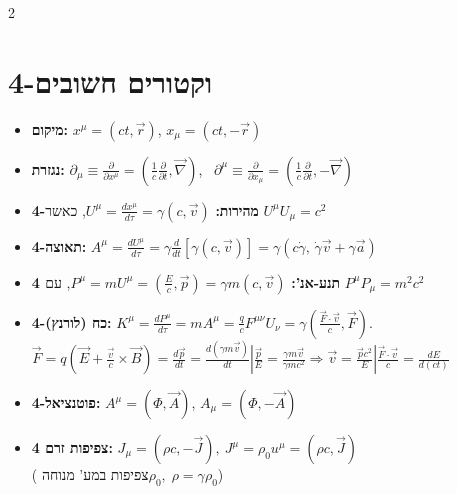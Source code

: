 \documentclass[10pt,a4paper]{article}
\begin{document}
\begin{multicols*}{2}
\section{4-וקטורים חשובים}
\begin{itemize}
    \item \textbf{מיקום:} $x^\mu = (ct, \vec{r})$, \quad $x_\mu = (ct, -\vec{r})$
    \item \textbf{נגזרת:} $\partial_\mu \equiv \frac{\partial}{\partial x^\mu} = \left(\frac{1}{c}\frac{\partial}{\partial t}, \vec{\nabla}\right)$, \ $\partial^\mu \equiv \frac{\partial}{\partial x_\mu} = \left(\frac{1}{c}\frac{\partial}{\partial t}, -\vec{\nabla}\right)$
    \item \textbf{4-מהירות:} $U^\mu = \frac{dx^\mu}{d\tau} = \gamma(c, \vec{v})$, כאשר $U^\mu U_\mu = c^2$
    \item \textbf{4-תאוצה:} $A^\mu = \frac{dU^\mu}{d\tau} = \gamma \frac{d}{dt}\left[\gamma(c, \vec{v})\right] = \gamma\left(c \dot{\gamma}, \, \dot{\gamma}\vec{v} + \gamma\vec{a}\right)$
    \\
    \item \textbf{4 תנע-אנ':} $P^\mu = m U^\mu = \left(\frac{E}{c}, \vec{p}\right) = \gamma m(c, \vec{v})$, עם $P^\mu P_\mu = m^2 c^2$
    \item \textbf{4-כח (לורנץ):} $K^\mu = \frac{dP^\mu}{d\tau} = m A^\mu = \frac{q}{c} F^{\mu\nu} U_\nu = \gamma \left( \frac{\vec{F} \cdot \vec{v}}{c}, \vec{F} \right)$. \\ {\small$\vec{F} = q (\vec{E} + \frac{\vec{v}}{c} \times \vec{B}) = \frac{d\vec{p}}{dt} = \frac{d(\gamma m \vec{v})}{dt} | \frac{\vec{p}}{E} = \frac{\gamma m\vec{v}}{\gamma m c^2} \Rightarrow \vec{v} = \frac{\vec{p}c^2}{E} | \frac{\vec{F} \cdot \vec{v}}{c}=\frac{dE}{d(ct)}$}
    \item \textbf{4-פוטנציאל:} $A^\mu = (\Phi, \vec{A})$, \quad $A_\mu = (\Phi, -\vec{A})$
    \item \textbf{4 צפיפות זרם:} $J_\mu = (\rho c, -\vec{J}), \ J^\mu = \rho_0 u^\mu = (\rho c, \vec{J})$ \\ ($\text{ צפיפות במע' מנוחה} \rho_0, \; \rho = \gamma \rho_0$)
\end{itemize}


\end{multicols*}
\end{document}
